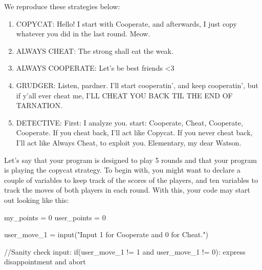 \documentclass[
  letterpaper,
  DIV=11,
  numbers=noendperiod]{scrreprt}
\newenvironment{Shaded}{\begin{snugshade}}{\end{snugshade}}
\newcommand{\CommentTok}[1]{\textcolor[rgb]{0.37,0.37,0.37}{#1}}
\newcommand{\ControlFlowTok}[1]{\textcolor[rgb]{0.00,0.23,0.31}{#1}}
\newcommand{\DecValTok}[1]{\textcolor[rgb]{0.68,0.00,0.00}{#1}}
\newcommand{\FunctionTok}[1]{\textcolor[rgb]{0.28,0.35,0.67}{#1}}
\newcommand{\NormalTok}[1]{\textcolor[rgb]{0.00,0.23,0.31}{#1}}
\newcommand{\OperatorTok}[1]{\textcolor[rgb]{0.37,0.37,0.37}{#1}}
\newcommand{\StringTok}[1]{\textcolor[rgb]{0.13,0.47,0.30}{#1}}
\providecommand{\tightlist}{%
  \setlength{\itemsep}{0pt}\setlength{\parskip}{0pt}}\usepackage{longtable,booktabs,array}
\begin{document}
We reproduce these strategies below:

\begin{tcolorbox}[standard jigsaw,toptitle=1mm, titlerule=0mm, bottomtitle=1mm, title=\textcolor{quarto-callout-note-color}{\faInfo}\hspace{0.5em}{Player Strategies}, coltitle=black, colback=white, toprule=.15mm, colframe=quarto-callout-note-color-frame, arc=.35mm, rightrule=.15mm, opacityback=0, left=2mm, leftrule=.75mm, colbacktitle=quarto-callout-note-color!10!white, opacitybacktitle=0.6, bottomrule=.15mm]

\begin{enumerate}
\def\labelenumi{\arabic{enumi}.}
\tightlist
\item
  COPYCAT: Hello! I start with Cooperate, and afterwards, I just copy
  whatever you did in the last round. Meow.
\item
  ALWAYS CHEAT: The strong shall eat the weak.
\item
  ALWAYS COOPERATE: Let's be best friends \textless3
\item
  GRUDGER: Listen, pardner. I'll start cooperatin', and keep
  cooperatin', but if y'all ever cheat me, I'LL CHEAT YOU BACK TIL THE
  END OF TARNATION.
\item
  DETECTIVE: First: I analyze you. start: Cooperate, Cheat, Cooperate,
  Cooperate. If you cheat back, I'll act like Copycat. If you never
  cheat back, I'll act like Always Cheat, to exploit you. Elementary, my
  dear Watson.
\end{enumerate}

\end{tcolorbox}

Let's say that your program is designed to play 5 rounds and that your
program is playing the copycat strategy. To begin with, you might want
to declare a couple of variables to keep track of the scores of the
players, and ten variables to track the moves of both players in each
round. With this, your code may start out looking like this:

\begin{Shaded}
\begin{Highlighting}[]
\NormalTok{my\_points }\OperatorTok{=} \DecValTok{0}
\NormalTok{user\_points }\OperatorTok{=} \DecValTok{0}

\NormalTok{user\_move\_1 }\OperatorTok{=} \FunctionTok{input}\OperatorTok{(}\StringTok{"Input 1 for Cooperate and 0 for Cheat."}\OperatorTok{)}

\CommentTok{//Sanity check input:}
\ControlFlowTok{if}\OperatorTok{(}\NormalTok{user\_move\_1 }\OperatorTok{!=} \DecValTok{1}\NormalTok{ and user\_move\_1 }\OperatorTok{!=} \DecValTok{0}\OperatorTok{):}
\NormalTok{    express disappointment and abort}
\end{Highlighting}
\end{Shaded}
\end{document}
